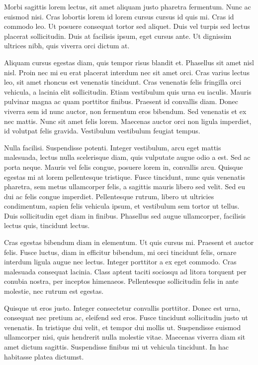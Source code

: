 \par
Morbi sagittis lorem lectus, sit amet aliquam justo pharetra fermentum. Nunc ac euismod nisi. Cras lobortis lorem id lorem cursus cursus id quis mi. Cras id commodo leo. Ut posuere consequat tortor sed aliquet. Duis vel turpis sed lectus placerat sollicitudin. Duis at facilisis ipsum, eget cursus ante. Ut dignissim ultrices nibh, quis viverra orci dictum at.
\par
Aliquam cursus egestas diam, quis tempor risus blandit et. Phasellus sit amet nisl nisl. Proin nec mi eu erat placerat interdum nec sit amet orci. Cras varius lectus leo, sit amet rhoncus est venenatis tincidunt. Cras venenatis felis fringilla orci vehicula, a lacinia elit sollicitudin. Etiam vestibulum quis urna eu iaculis. Mauris pulvinar magna ac quam porttitor finibus. Praesent id convallis diam. Donec viverra sem id nunc auctor, non fermentum eros bibendum. Sed venenatis et ex nec mattis. Nunc sit amet felis lorem. Maecenas auctor orci non ligula imperdiet, id volutpat felis gravida. Vestibulum vestibulum feugiat tempus.
\par
Nulla facilisi. Suspendisse potenti. Integer vestibulum, arcu eget mattis malesuada, lectus nulla scelerisque diam, quis vulputate augue odio a est. Sed ac porta neque. Mauris vel felis congue, posuere lorem in, convallis arcu. Quisque egestas mi at lorem pellentesque tristique. Fusce tincidunt, nunc quis venenatis pharetra, sem metus ullamcorper felis, a sagittis mauris libero sed velit. Sed eu dui ac felis congue imperdiet. Pellentesque rutrum, libero ut ultricies condimentum, sapien felis vehicula ipsum, et vestibulum sem tortor ut tellus. Duis sollicitudin eget diam in finibus. Phasellus sed augue ullamcorper, facilisis lectus quis, tincidunt lectus.
\par
Cras egestas bibendum diam in elementum. Ut quis cursus mi. Praesent et auctor felis. Fusce luctus, diam in efficitur bibendum, mi orci tincidunt felis, ornare interdum ligula augue nec lectus. Integer porttitor a ex eget commodo. Cras malesuada consequat lacinia. Class aptent taciti sociosqu ad litora torquent per conubia nostra, per inceptos himenaeos. Pellentesque sollicitudin felis in ante molestie, nec rutrum est egestas.
\par
Quisque ut eros justo. Integer consectetur convallis porttitor. Donec est urna, consequat nec pretium ac, eleifend sed eros. Fusce tincidunt sollicitudin justo ut venenatis. In tristique dui velit, et tempor dui mollis ut. Suspendisse euismod ullamcorper nisi, quis hendrerit nulla molestie vitae. Maecenas viverra diam sit amet dictum sagittis. Suspendisse finibus mi ut vehicula tincidunt. In hac habitasse platea dictumst.
